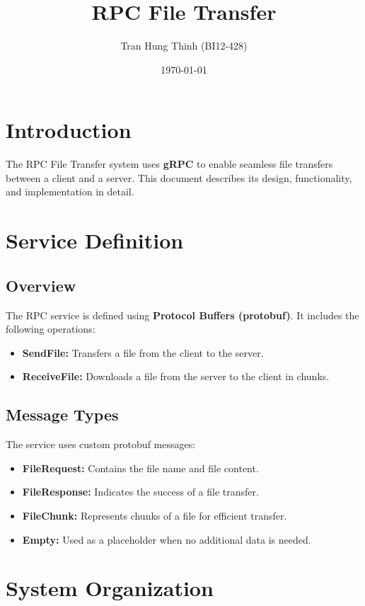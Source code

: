 \documentclass{article}
\title{RPC File Transfer}
\author{Tran Hung Thinh (BI12-428)}
\date{\today}
\begin{document}
\maketitle

\section{Introduction}
The RPC File Transfer system uses \textbf{gRPC} to enable seamless file transfers between a client and a server. This document describes its design, functionality, and implementation in detail.

\section{Service Definition}

\subsection{Overview}
The RPC service is defined using \textbf{Protocol Buffers (protobuf)}. It includes the following operations:
\begin{itemize}
    \item \textbf{SendFile:} Transfers a file from the client to the server.
    \item \textbf{ReceiveFile:} Downloads a file from the server to the client in chunks.
\end{itemize}

\subsection{Message Types}
The service uses custom protobuf messages:
\begin{itemize}
    \item \textbf{FileRequest:} Contains the file name and file content.
    \item \textbf{FileResponse:} Indicates the success of a file transfer.
    \item \textbf{FileChunk:} Represents chunks of a file for efficient transfer.
    \item \textbf{Empty:} Used as a placeholder when no additional data is needed.
\end{itemize}

\section{System Organization}
\end{document}
